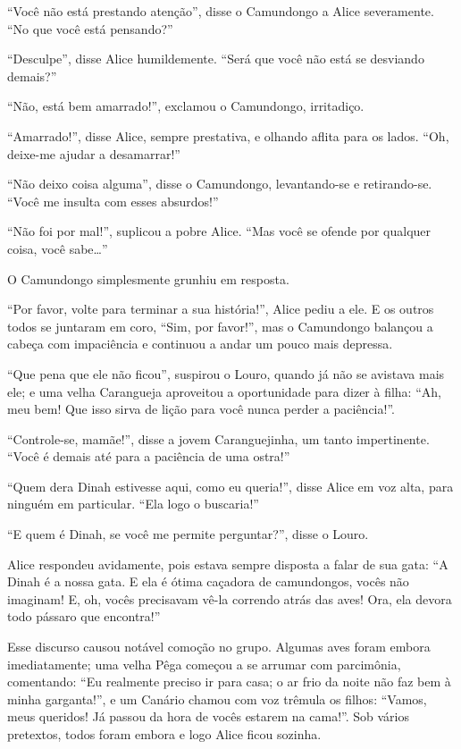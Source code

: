 ``Você não está prestando atenção'', disse o Camundongo a Alice
severamente. ``No que você está pensando?''

``Desculpe'', disse Alice humildemente. ``Será que você não está se
desviando demais?''

``Não, está bem amarrado!'', exclamou o Camundongo, irritadiço.

``Amarrado!'', disse Alice, sempre prestativa, e olhando aflita para os
lados. ``Oh, deixe-me ajudar a desamarrar!''

``Não deixo coisa alguma'', disse o Camundongo, levantando-se e
retirando-se. ``Você me insulta com esses absurdos!''

``Não foi por mal!'', suplicou a pobre Alice. ``Mas você se ofende por
qualquer coisa, você sabe\ldots{}''

O Camundongo simplesmente grunhiu em resposta.

``Por favor, volte para terminar a sua história!'', Alice pediu a ele. E
os outros todos se juntaram em coro, ``Sim, por favor!'', mas o
Camundongo balançou a cabeça com impaciência e continuou a andar um
pouco mais depressa.

``Que pena que ele não ficou'', suspirou o Louro, quando já não se
avistava mais ele; e uma velha Carangueja aproveitou a oportunidade para
dizer à filha: ``Ah, meu bem! Que isso sirva de lição para você nunca
perder a paciência!''.

``Controle-se, mamãe!'', disse a jovem Caranguejinha, um tanto
impertinente. ``Você é demais até para a paciência de uma ostra!''

``Quem dera Dinah estivesse aqui, como eu queria!'', disse Alice em voz
alta, para ninguém em particular. ``Ela logo o buscaria!''

``E quem é Dinah, se você me permite perguntar?'', disse o Louro.

Alice respondeu avidamente, pois estava sempre disposta a falar de sua
gata: ``A Dinah é a nossa gata. E ela é ótima caçadora de camundongos,
vocês não imaginam! E, oh, vocês precisavam vê-la correndo atrás das
aves! Ora, ela devora todo pássaro que encontra!''

Esse discurso causou notável comoção no grupo. Algumas aves foram embora
imediatamente; uma velha Pêga começou a se arrumar com parcimônia,
comentando: ``Eu realmente preciso ir para casa; o ar frio da noite não
faz bem à minha garganta!'', e um Canário chamou com voz trêmula os
filhos: ``Vamos, meus queridos! Já passou da hora de vocês estarem na
cama!''. Sob vários pretextos, todos foram embora e logo Alice ficou
sozinha.

